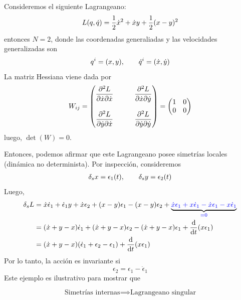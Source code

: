 \begin{ej}
	Consideremos el siguiente Lagrangeano:
	\begin{equation}
  L(q,\dot{q} )=\frac{1}{2}\dot{x}^2+\dot{x}y+\frac{1}{2}(x-y)^2
\end{equation}
entonces $N=2$, donde las coordenadas generaliadas y las velocidades generalizadas son
\begin{equation}
  q^{i}=(x,y),\qquad \dot{q}^{i}=(\dot{x},\dot{y})
\end{equation}
La matriz Hessiana viene dada por
\begin{equation}
  W_{ij}=\mqty(\dfrac{\partial^2L}{\partial\dot{x}\partial\dot{x}} &&&\dfrac{\partial^2L}{\partial\dot{x}\partial\dot{y}} \\\\\dfrac{\partial^2L}{\partial\dot{y}\partial\dot{x}} &&&\dfrac{\partial^2L}{\partial\dot{y}\partial\dot{y}} )=\mqty(1&0\\0&0)
\end{equation}
luego, $\det(W)=0$.

Entonces, podemos afirmar que este Lagrangeano posee simetrías locales (dinámica no determinista). Por inspección, consideremos 
\begin{align}
  \delta_sx=\epsilon_1(t),\qquad \delta_sy=\epsilon_2(t)
\end{align}
Luego, 
\begin{align}
  \delta_sL&=\dot{x}\dot{\epsilon}_1+\dot{\epsilon}_1y+\dot{x}\epsilon_2+(x-y)\epsilon_1-(x-y)\epsilon_2 + \underbrace{\textcolor{blue}{\dot{x}\epsilon_1+x\dot{\epsilon}_1-\dot{x}\epsilon_1-x\dot{\epsilon}_1}}_{\textcolor{blue}{=0}}\\
  &=(\dot{x}+y-x)\dot{\epsilon}_1+(\dot{x}+y-x)\epsilon_2-(\dot{x}+y-x)\epsilon_1+\dv{t}(x\epsilon_1)\\
  &=(\dot{x}+y-x)(\dot{\epsilon}_1+\epsilon_2-\epsilon_1)+\dv{t}(x\epsilon_1)
\end{align}
Por lo tanto, la acción es invariante si
\begin{equation}
\boxed{  \epsilon_2=\epsilon_1-\dot{\epsilon}_1}
\end{equation}
Este ejemplo es ilustrativo para mostrar que
\begin{tcolorbox}
	\begin{equation}
		\text{Simetrías internas}\implies\text{Lagrangeano singular}
	\end{equation}
\end{tcolorbox}
\end{ej}


